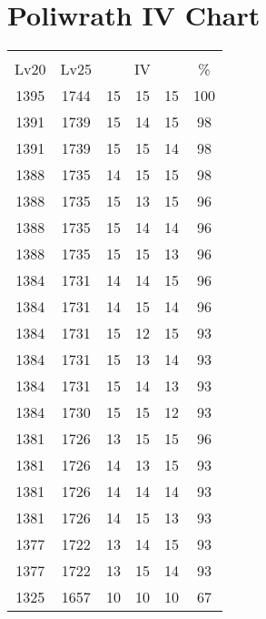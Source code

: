 \documentclass{article}%
\begin{document}
%
\normalsize%
\section{Poliwrath IV Chart}%
\label{sec:Poliwrath IV Chart}%
\renewcommand{\arraystretch}{1.5}%
\begin{tabular}{|c|c|c|c|c|c|}%
\hline%
\multicolumn{6}{|c|}{\textcolor{white}{ 
\linebreak{Poliwrath}
}%
\cellcolor{black}}\\%
\multicolumn{1}{|c}{Lv20}&\multicolumn{1}{c|}{Lv25}&\multicolumn{3}{c|}{IV}&\multicolumn{1}{|c|}{\%}\\%
\hline%
\rowcolor{color100}%
1395&1744&15&15&15&100\\%
\hline%
\rowcolor{color98}%
1391&1739&15&14&15&98\\%
\hline%
\rowcolor{color98}%
1391&1739&15&15&14&98\\%
\hline%
\rowcolor{color98}%
1388&1735&14&15&15&98\\%
\hline%
\rowcolor{color96}%
1388&1735&15&13&15&96\\%
\hline%
\rowcolor{color96}%
1388&1735&15&14&14&96\\%
\hline%
\rowcolor{color96}%
1388&1735&15&15&13&96\\%
\hline%
\rowcolor{color96}%
1384&1731&14&14&15&96\\%
\hline%
\rowcolor{color96}%
1384&1731&14&15&14&96\\%
\hline%
\rowcolor{color93}%
1384&1731&15&12&15&93\\%
\hline%
\rowcolor{color93}%
1384&1731&15&13&14&93\\%
\hline%
\rowcolor{color93}%
1384&1731&15&14&13&93\\%
\hline%
\rowcolor{color93}%
1384&1730&15&15&12&93\\%
\hline%
\rowcolor{color96}%
1381&1726&13&15&15&96\\%
\hline%
\rowcolor{color93}%
1381&1726&14&13&15&93\\%
\hline%
\rowcolor{color93}%
1381&1726&14&14&14&93\\%
\hline%
\rowcolor{color93}%
1381&1726&14&15&13&93\\%
\hline%
\rowcolor{color93}%
1377&1722&13&14&15&93\\%
\hline%
\rowcolor{color93}%
1377&1722&13&15&14&93\\%
\hline%
\rowcolor{color91}%
1325&1657&10&10&10&67\\%
\end{tabular}

%
\end{document}
